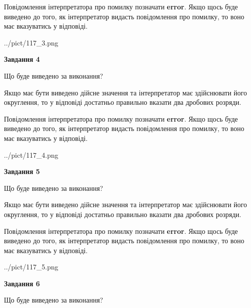 \documentclass[12pt, ukrainian]{article}
\begin{document}
{\begin {Large}
Повідомлення інтерпретатора про помилку позначати \textbf{error}.
Якщо щось буде виведено до того, як інтерпретатор видасть повідомлення про помилку, 
то воно має вказуватись у відповіді. \par

\begin{center}
	{../pict/117_3.png}
\end{center}
\newpage

{\begin {center}\textbf{Завдання 4}\end {center}}\par
Що буде виведено за виконання? \par

Якщо має бути виведено дійсне значення та інтерпретатор має здійснювати його округлення, 
то у відповіді достатньо правильно вказати два дробових розряди.

Повідомлення інтерпретатора про помилку позначати \textbf{error}.
Якщо щось буде виведено до того, як інтерпретатор видасть повідомлення про помилку, 
то воно має вказуватись у відповіді. \par

\begin{center}
	{../pict/117_4.png}
\end{center}
\newpage

{\begin {center}\textbf{Завдання 5}\end {center}}\par
Що буде виведено за виконання? \par

Якщо має бути виведено дійсне значення та інтерпретатор має здійснювати його округлення, 
то у відповіді достатньо правильно вказати два дробових розряди.

Повідомлення інтерпретатора про помилку позначати \textbf{error}.
Якщо щось буде виведено до того, як інтерпретатор видасть повідомлення про помилку, 
то воно має вказуватись у відповіді. \par

\begin{center}
	{../pict/117_5.png}
\end{center}
\newpage

{\begin {center}\textbf{Завдання 6}\end {center}}\par
Що буде виведено за виконання? \par


\end{Large}}
\end{document}
